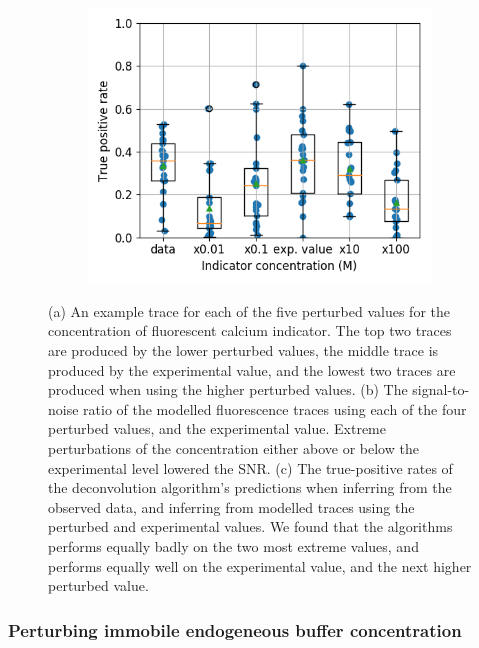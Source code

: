 \documentclass[a4paper,12pt]{article}
\theoremstyle{definition}
\begin{document}
\begin{figure}
\begin{subfigure}{0.5\textwidth}
	   \includegraphics[width=\linewidth]{figures/indictor_perturbed_oasis_first_paper.png}
     \caption{}
  \end{subfigure}
  \caption{(a) An example trace for each of the five perturbed values for the concentration of fluorescent calcium indicator. The top two traces are produced by the lower perturbed values, the middle trace is produced by the experimental value, and the lowest two traces are produced when using the higher perturbed values. (b) The signal-to-noise ratio of the modelled fluorescence traces using each of the four perturbed values, and the experimental value. Extreme perturbations of the concentration either above or below the experimental level lowered the SNR. (c) The true-positive rates of the deconvolution algorithm's predictions when inferring from the observed data, and inferring from modelled traces using the perturbed and experimental values. We found that the algorithms performs equally badly on the two most extreme values, and performs equally well on the experimental value, and the next higher perturbed value.}
  \label{fig:indicator_perturbed}
\end{figure}

\subsubsection{Perturbing immobile endogeneous buffer concentration}
\end{document}
